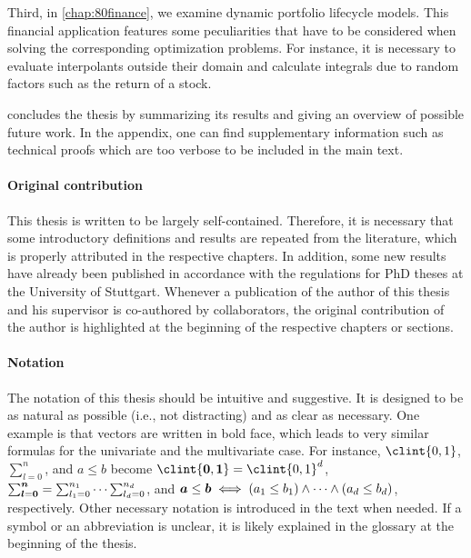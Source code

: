 Third, in \cref{chap:80finance},
we examine dynamic portfolio lifecycle models.
This financial application features some peculiarities that have
to be considered when solving the corresponding optimization problems.
For instance, it is necessary to evaluate interpolants outside their domain
and calculate integrals due to random factors such as the return of a stock.

 concludes the thesis by
summarizing its results and giving an overview of possible future work.
In the appendix, one can find supplementary information such as
technical proofs which are too verbose to be included in the main text.

\paragraph{Original contribution}

This thesis is written to be largely self-contained.
Therefore, it is necessary that some introductory definitions and
results are repeated from the literature,
which is properly attributed in the respective chapters.
In addition, some new results have already been published in accordance
with the regulations for PhD theses at the University of Stuttgart.
Whenever a publication of the author of this thesis and his supervisor
is co-authored by collaborators,
the original contribution of the author is highlighted 
at the beginning of the respective chapters or sections.

\paragraph{Notation}

The notation of this thesis should be intuitive and suggestive.
It is designed to be as natural as possible (i.e., not distracting)
and as clear as necessary.
One example is that vectors are written in bold face, which leads to
very similar formulas for the univariate and the multivariate case.
For instance, $\clint{0, 1}$, $\sum_{l=0}^n$, and $a \le b$ become
$\clint{\*0, \*1} = \clint{0, 1}^d$,
$\sum_{{\boldsymbol{l}}={\boldsymbol{0}}}^{{\boldsymbol{n}}} = \sum_{l_1=0}^{n_1} \dotsb \sum_{l_d=0}^{n_d}$, and
${\boldsymbol{a}} \le {\boldsymbol{b}} \iff (a_1 \le b_1) \land \dotsb \land (a_d \le b_d)$,
respectively.
Other necessary notation is introduced in the text when needed.
If a symbol or an abbreviation is unclear,
it is likely explained in the glossary at the beginning of the thesis.

\cleardoublepage
